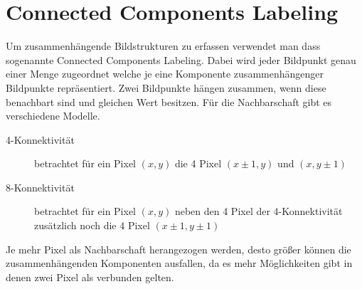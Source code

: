 \section*{Connected Components Labeling}

Um zusammenhängende Bildstrukturen zu erfassen verwendet man dass sogenannte
Connected Components Labeling. Dabei wird jeder Bildpunkt genau einer Menge
zugeordnet welche je eine Komponente zusammenhängenger Bildpunkte repräsentiert.
Zwei Bildpunkte hängen zusammen, wenn diese benachbart sind und gleichen Wert
besitzen. Für die Nachbarschaft gibt es verschiedene Modelle.

\begin{description}
  \item[4-Konnektivität]
    betrachtet für ein Pixel $(x,y)$ die 4 Pixel $(x\pm1,y)$ und $(x,y\pm1)$
  \item[8-Konnektivität]
    betrachtet für ein Pixel $(x,y)$ neben den 4 Pixel der 4-Konnektivität
    zusätzlich noch die 4 Pixel $(x\pm1,y\pm1)$
\end{description}

Je mehr Pixel als Nachbarschaft herangezogen werden, desto größer können die
zusammenhängenden Komponenten ausfallen, da es mehr Möglichkeiten gibt in denen
zwei Pixel als verbunden gelten.
